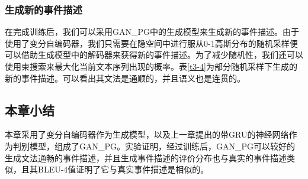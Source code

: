 \subsubsection{生成新的事件描述}
在完成训练后，我们可以采用GAN\_PG中的生成模型来生成新的事件描述。由于使用了变分自编码器，我们只需要在隐空间中进行服从0-1高斯分布的随机采样便可以借助生成模型中的解码器来获得新的事件描述。为了减少随机性，我们还可以使用束搜索来最大化当前文本序列出现的概率。表\ref{t3-4}为部分随机采样下生成的新的事件描述。可以看出其文法是通顺的，并且语义也是连贯的。

\subsection{本章小结}
本章采用了变分自编码器作为生成模型，以及上一章提出的带GRU的神经网络作为判别模型，组成了GAN\_PG。实验证明，经过训练后，GAN\_PG可以较好的生成文法通畅的事件描述，并且生成事件描述的评价分布也与真实的事件描述类似，且其BLEU-4值证明了它与真实事件描述是相似的。


